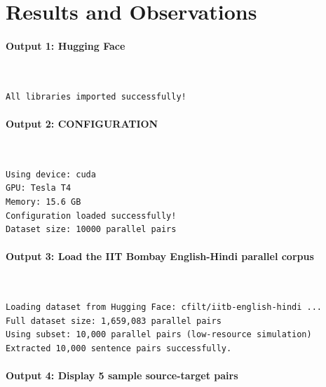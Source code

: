 \documentclass[12pt,a4paper,oneside]{report}
\begin{document}
\section{Results and Observations}
\paragraph{Output 1: Hugging Face}\mbox{}\\[-1ex]
\begin{Verbatim}[commandchars=\\\{\},breaklines=true,breakanywhere=true,fontsize=\scriptsize,frame=leftline,framesep=2mm,rulecolor=\color{gray}]
All libraries imported successfully!
\end{Verbatim}
\paragraph{Output 2: CONFIGURATION}\mbox{}\\[-1ex]
\begin{Verbatim}[commandchars=\\\{\},breaklines=true,breakanywhere=true,fontsize=\scriptsize,frame=leftline,framesep=2mm,rulecolor=\color{gray}]
Using device: cuda
GPU: Tesla T4
Memory: 15.6 GB
Configuration loaded successfully!
Dataset size: 10000 parallel pairs
\end{Verbatim}
\paragraph{Output 3: Load the IIT Bombay English-Hindi parallel corpus}\mbox{}\\[-1ex]
\begin{Verbatim}[commandchars=\\\{\},breaklines=true,breakanywhere=true,fontsize=\scriptsize,frame=leftline,framesep=2mm,rulecolor=\color{gray}]
Loading dataset from Hugging Face: cfilt/iitb-english-hindi ...
Full dataset size: 1,659,083 parallel pairs
Using subset: 10,000 parallel pairs (low-resource simulation)
Extracted 10,000 sentence pairs successfully.
\end{Verbatim}
\paragraph{Output 4: Display 5 sample source-target pairs}\mbox{}\\[-1ex]
\end{document}
